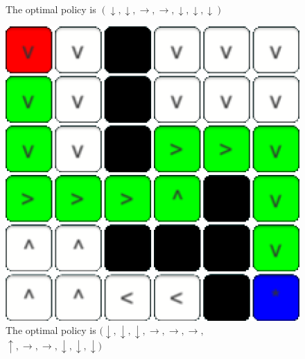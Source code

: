 \documentclass[conference]{IEEEtran}
\begin{document}
\begin{figure}[h]
\begin{minipage}[t]{0.3\linewidth}
\caption{The optimal policy is $(\downarrow,\downarrow,\rightarrow,\rightarrow,\downarrow,\downarrow,\downarrow)$}
\end{minipage}
\hfill
\begin{minipage}[t]{0.3\linewidth}
\centering
\includegraphics[width=1\textwidth]{images/Policies/03.png}
\caption{The optimal policy is $(\downarrow,\downarrow,\downarrow,\rightarrow,\rightarrow,\rightarrow,$\\$\uparrow,\rightarrow,\rightarrow,\downarrow,\downarrow,\downarrow)$}
\end{minipage}
\end{figure}
\end{document}
